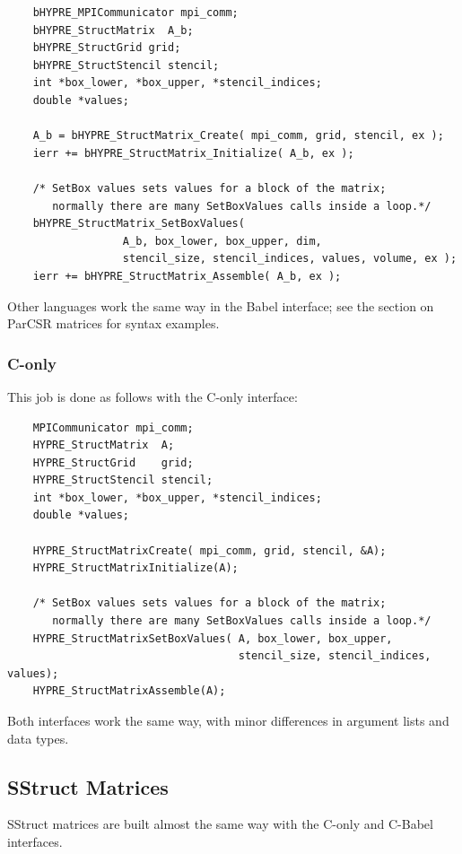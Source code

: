 \begin{verbatim}
    bHYPRE_MPICommunicator mpi_comm;
    bHYPRE_StructMatrix  A_b;
    bHYPRE_StructGrid grid;
    bHYPRE_StructStencil stencil;
    int *box_lower, *box_upper, *stencil_indices;
    double *values;

    A_b = bHYPRE_StructMatrix_Create( mpi_comm, grid, stencil, ex );
    ierr += bHYPRE_StructMatrix_Initialize( A_b, ex );

    /* SetBox values sets values for a block of the matrix;
       normally there are many SetBoxValues calls inside a loop.*/
    bHYPRE_StructMatrix_SetBoxValues(
                  A_b, box_lower, box_upper, dim,
                  stencil_size, stencil_indices, values, volume, ex );
    ierr += bHYPRE_StructMatrix_Assemble( A_b, ex );
\end{verbatim}


Other languages work the same way in the Babel interface; see the
section on ParCSR matrices for syntax examples.

\subsubsection{C-only}

This job is done as follows with the C-only interface:

\begin{verbatim}
    MPICommunicator mpi_comm;
    HYPRE_StructMatrix  A;
    HYPRE_StructGrid    grid;
    HYPRE_StructStencil stencil;
    int *box_lower, *box_upper, *stencil_indices;
    double *values;

    HYPRE_StructMatrixCreate( mpi_comm, grid, stencil, &A);
    HYPRE_StructMatrixInitialize(A);

    /* SetBox values sets values for a block of the matrix;
       normally there are many SetBoxValues calls inside a loop.*/
    HYPRE_StructMatrixSetBoxValues( A, box_lower, box_upper,
                                    stencil_size, stencil_indices, values);
    HYPRE_StructMatrixAssemble(A);
\end{verbatim}


Both interfaces work the same way, with minor differences in argument
lists and data types.

\subsection{SStruct Matrices}

SStruct matrices are built almost the same way with
the C-only and C-Babel interfaces.

